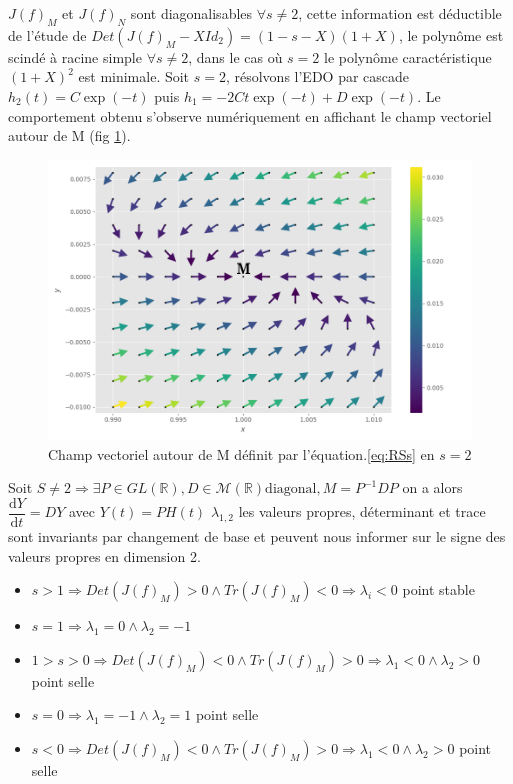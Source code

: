 \documentclass{wsdcr}
\begin{document}
$J(f)_{M}$ et $ J(f)_{N}$ sont diagonalisables $\forall s \neq 2$, cette information est déductible de l'étude de $Det(J(f)_{M}-XId_2)=(1-s-X)(1+X)$, le polynôme est scindé à racine simple $\forall s \neq 2$, dans le cas où $s=2$ le polynôme caractéristique $(1+X)^2$ est minimale. Soit $s=2$, résolvons l'EDO par cascade $h_2(t)=C\exp(-t)$ puis $h_1=-2Ct\exp(-t)+D\exp(-t)$. Le comportement obtenu s'observe numériquement en affichant le champ vectoriel autour de M (fig \ref{fig:JM}). \\
\begin{figure}
    \centering
    \includegraphics[width=\linewidth]{fig/lv2_vfM.png}
    \caption{Champ vectoriel autour de M définit par l'équation.\ref{eq:RSs} en $s=2$}
    \label{fig:JM}
\end{figure}
Soit $S\neq2 \Rightarrow \exists P \in GL(\mathbb{R}),D \in \mathcal{M}(\mathbb{R}) \text{diagonal}, M = P^{-1}DP$ on a alors ${\dfrac {\mathrm {d} Y}{\mathrm {d} t}}=DY$ avec $Y(t)=PH(t)$ $\lambda_{1,2}$ les valeurs propres, déterminant et trace sont invariants par changement de base et peuvent nous informer sur le signe des valeurs propres en dimension 2.
\begin{itemize}
	\item $s>1 \Rightarrow Det(J(f)_{M})>0 \land Tr(J(f)_{M})<0 \Rightarrow \lambda_i<0$ {\color{red}point stable}
	\item $s=1 \Rightarrow \lambda_1=0 \land \lambda_2=-1$ 
	\item $1>s>0 \Rightarrow Det(J(f)_{M})<0 \land Tr(J(f)_{M})>0 \Rightarrow \lambda_1<0 \land \lambda_2>0$ {\color{red}point selle}
	\item $s=0 \Rightarrow \lambda_1=-1 \land \lambda_2=1$ {\color{red}point selle}
	\item $s<0 \Rightarrow Det(J(f)_{M})<0 \land Tr(J(f)_{M})>0 \Rightarrow \lambda_1<0 \land \lambda_2>0$ {\color{red}point selle}
\end{itemize}
\end{document}
